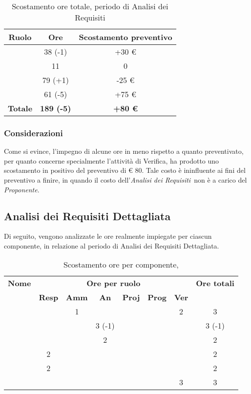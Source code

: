 \begin{table}[H]
	\begin{center}
		\begin{tabular}{|c|c|c|}
			\hline
			\textbf{Ruolo}	& \textbf{Ore}	& \textbf{Scostamento preventivo} \\
			\hline
			\Res	&	38 (-1)	&  +30 € \\
			\hline
			\Amm	&	11	&  0 \\
			\hline
			\Ana	&	79 (+1)	&  -25 € \\
			\hline
			\Ver	&	61 (-5)	&  +75 €\\
			\hline
			\textbf{Totale} & \textbf{189 (-5)} & \textbf{+80 €}\\
			\hline
		\end{tabular}
	\end{center}
	\caption{Scostamento ore totale, periodo di Analisi dei Requisiti}
\end{table}

\subsubsection{Considerazioni}
Come si evince, l'impegno di alcune ore in meno rispetto a quanto preventivato, per quanto concerne specialmente l'attività di Verifica, ha prodotto uno scostamento in positivo del preventivo di € 80. Tale costo è ininfluente ai fini del preventivo a finire, in quando il costo dell'\textit{Analisi dei Requisiti}\ non è a carico del \textit{Proponente}.


\subsection{Analisi dei Requisiti Dettagliata}

Di seguito, vengono analizzate le ore realmente impiegate per ciascun componente, in relazione al periodo di Analisi dei Requisiti Dettagliata.

\begin{table}[H]
	\begin{center}
		\begin{tabular}{|c|c|c|c|c|c|c|c|}
			\hline
			\textbf{Nome} & \multicolumn{6}{c|}{\textbf{Ore per ruolo}} & \textbf{Ore totali} \\\cline{2-7}
			& \textbf{Resp} & \textbf{Amm} & \textbf{An} & \textbf{Proj} & \textbf{Prog} & \textbf{Ver} & \\
			\hline
			\MC			&		&	1	&	 	&		&		&	2 	&	 3	\\
			\hline
			\AN			&		&		&	3 (-1) 	&	 	&		&	 	& 	 3 (-1)	\\
			\hline
			\DAN		&		&	 	&	2 	&		&		&		&	 2	\\
			\hline
			\AS			&	2	&	 	&	  	&		&	 	& 		&	 2	\\
			\hline
			\NS 		&	2	&		&	 	&		&		& 		&	 2	\\
			\hline
			\DS			& 		&	 	&	 	&		&		&	3 	&	 3	\\
			\hline
		\end{tabular}
	\end{center}
	\caption{Scostamento ore per componente, \ARD}
\end{table}

